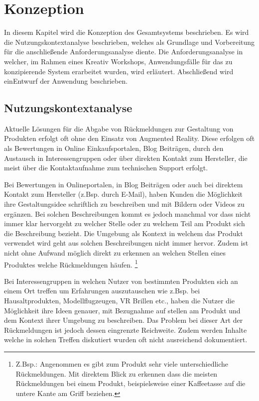 \chapter{Konzeption}

In diesem Kapitel wird die Konzeption des Gesamtsystems beschrieben. Es wird die Nutzungskontextanalyse beschrieben, welches als Grundlage und Vorbereitung für die anschließende Anforderungsanalyse diente. Die Anforderungsanalyse in welcher, im Rahmen eines Kreativ Workshops, Anwendungsfälle für das zu konzipierende System erarbeitet wurden, wird erläutert. Abschließend wird einEntwurf der Anwendung beschrieben.

\section{Nutzungskontextanalyse}

Aktuelle Lösungen für die Abgabe von Rückmeldungen zur Gestaltung von Produkten erfolgt oft ohne den Einsatz von Augmented Reality. Diese erfolgen 
oft als Bewertungen in Online Einkaufsportalen, Blog Beiträgen, durch den Austausch in Interessengruppen oder über direkten Kontakt zum Hersteller, die 
meist über die Kontaktaufnahme zum technischen Support erfolgt.

Bei Bewertungen in Onlineportalen, in Blog Beiträgen oder auch bei direktem Kontakt zum Hersteller (z.Bsp. durch E-Mail), haben Kunden die Möglichkeit 
ihre Gestaltungsidee schriftlich zu beschreiben und mit Bildern oder Videos zu ergänzen. Bei solchen Beschreibungen kommt es jedoch manchmal vor dass 
nicht immer klar hervorgeht zu welcher Stelle oder zu welchem Teil am Produkt sich die Beschreibung bezieht. Die Umgebung als Kontext in welchem das Produkt 
verwendet wird geht aus solchen Beschreibungen nicht immer hervor. Zudem ist nicht ohne Aufwand möglich direkt zu erkennen an welchen Stellen eines Produktes 
welche Rückmeldungen häufen. \footnote{Z.Bsp.: Angenommen es gibt zum Produkt sehr viele unterschiedliche Rückmeldungen. Mit direktem Blick zu erkennen dass 
die meisten Rückmeldungen bei einem Produkt, beispielsweise einer Kaffeetasse auf die untere Kante am Griff beziehen.} 

Bei Interessengruppen in welchen Nutzer von bestimmten Produkten sich an einem Ort treffen um Erfahrungen auszutauschen wie z.Bsp. bei Hausaltprodukten, Modellflugzeugen, VR Brillen etc., 
haben die Nutzer die Möglichkeit ihre Ideen genauer, mit Bezugnahme auf stellen am Produkt und dem Kontext ihrer Umgebung zu beschreiben. Das Problem bei dieser Art 
der Rückmeldungen ist jedoch dessen eingrenzte Reichweite. Zudem werden Inhalte welche in solchen Treffen diskutiert wurden oft nicht ausreichend dokumentiert.  

